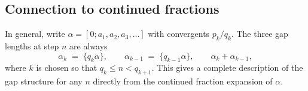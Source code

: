 \subsection*{Connection to continued fractions}

In general, write $\alpha = [0; a_1, a_2, a_3, \ldots]$ with convergents
$p_k/q_k$. The three gap lengths at step $n$ are always
\[
  \alpha_k \;=\; \{q_k \alpha\},\qquad
  \alpha_{k-1} \;=\; \{q_{k-1}\alpha\},\qquad
  \alpha_k + \alpha_{k-1},
\]
where $k$ is chosen so that $q_k \le n < q_{k+1}$. This gives a complete
description of the gap structure for any $n$ directly from the continued
fraction expansion of $\alpha$.
